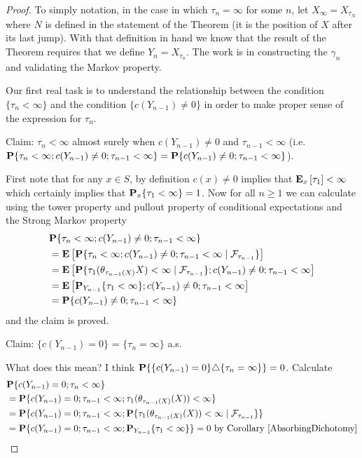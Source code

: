 \begin{proof}
To simply notation, in the case in which $\tau_n = \infty$ for some
$n$, let $X_\infty = X_{\tau_N}$ where $N$ is defined in the statement
of the Theorem (it is the position of $X$ after its last jump). With
that definition in hand we know that the result of the Theorem
requires that we define $Y_n = X_{\tau_n}$.  The work is in
constructing the $\gamma_n$ and validating the Markov property.

Our first real task is to understand the relationship between the condition
$\lbrace \tau_n < \infty \rbrace$ and the condition $\lbrace c(Y_{n-1})
\neq 0 \rbrace$ in order to make proper sense of the expression for
$\tau_n$.  

Claim: $\tau_n < \infty$ almost surely when $c(Y_{n-1}) \neq 0$ and
$\tau_{n-1} < \infty$
(i.e. $\probability{\tau_n < \infty;c(Y_{n-1}) \neq 0; \tau_{n-1} < \infty} =
\probability{c(Y_{n-1}) \neq 0; \tau_{n-1} < \infty}$).

First note that for any $x \in S$, by definition $c(x) \neq 0$ implies
that $\sexpectation{\tau_1}{x} < \infty$ which certainly implies that
$\sprobability{\tau_1 < \infty}{x} =1$.  Now for all $n \geq 1$ we can
calculate using the tower property and pullout property of conditional
expectations and the Strong Markov property
\begin{align*}
&\probability{\tau_n < \infty;c(Y_{n-1}) \neq 0; \tau_{n-1} < \infty} \\
&=\expectation{\cprobability{\mathcal{F}_{\tau_{n-1}}}{\tau_n <
    \infty;c(Y_{n-1}) \neq 0; \tau_{n-1} < \infty}} \\
&=\expectation{\cprobability{\mathcal{F}_{\tau_{n-1}}}{\tau_1(\theta_{\tau_{n-1}(X)}X) <
    \infty};c(Y_{n-1}) \neq 0; \tau_{n-1} < \infty} \\
&=\expectation{\sprobability{\tau_1 <
    \infty}{Y_{n-1}};c(Y_{n-1}) \neq 0; \tau_{n-1} < \infty} \\
&=\probability{c(Y_{n-1}) \neq 0; \tau_{n-1} < \infty} \\
\end{align*}
and the claim is proved.

Claim: $\lbrace c(Y_{n-1}) = 0 \rbrace$ = $\lbrace \tau_n = \infty
\rbrace$ a.s.

What does this mean?  I think $\probability{\lbrace c(Y_{n-1}) = 0
  \rbrace \triangle \lbrace \tau_n = \infty\rbrace} = 0$.
Calculate
\begin{align*}
&\probability{c(Y_{n-1}) = 0; \tau_n < \infty} \\
&=
\probability{c(Y_{n-1}) = 0; \tau_{n-1} < \infty;
  \tau_1(\theta_{\tau_{n-1}(X)}(X)) < \infty } \\
&= \probability{c(Y_{n-1}) = 0; \tau_{n-1} < \infty;
  \cprobability{\mathcal{F}_{\tau_{n-1}}}{\tau_1(\theta_{\tau_{n-1}(X)}(X)) < \infty }} \\
&= \probability{c(Y_{n-1}) = 0; \tau_{n-1} < \infty;
  \sprobability{\tau_1 < \infty }{Y_{n-1}}} = 0 \text{ by Corollary \ref{AbsorbingDichotomy}}\\
\end{align*}


\end{proof}
